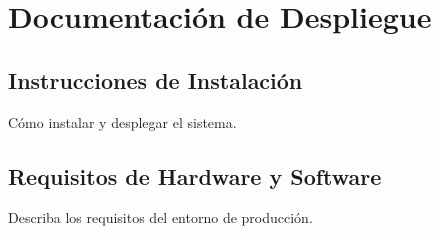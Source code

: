 	\chapter{Documentación de Despliegue}
	\section{Instrucciones de Instalación}
	Cómo instalar y desplegar el sistema.
	
	\section{Requisitos de Hardware y Software}
	Describa los requisitos del entorno de producción.
	
